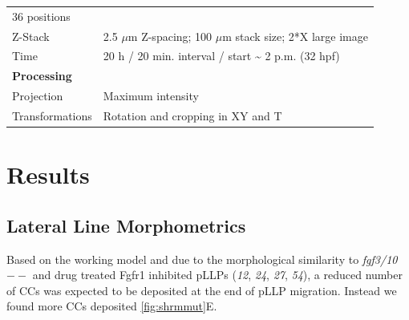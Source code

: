 \documentclass[11pt,singlespacinge,twoside]{reedthesis} %
\begin{document}
\begin{longtable}[]{@{}ll@{}}
\begin{minipage}[t]{0.73\columnwidth}
36 positions\strut
\end{minipage}\tabularnewline
\begin{minipage}[t]{0.21\columnwidth}\raggedright
Z-Stack\strut
\end{minipage} & \begin{minipage}[t]{0.73\columnwidth}\raggedright
2.5 \(\mu\)m Z-spacing; 100 \(\mu\)m stack size; 2*X large image\strut
\end{minipage}\tabularnewline
\begin{minipage}[t]{0.21\columnwidth}\raggedright
Time\strut
\end{minipage} & \begin{minipage}[t]{0.73\columnwidth}\raggedright
20 h / 20 min. interval / start \textasciitilde{} 2 p.m. (32 hpf)\strut
\end{minipage}\tabularnewline
\begin{minipage}[t]{0.21\columnwidth}\raggedright
\textbf{Processing}\strut
\end{minipage} & \begin{minipage}[t]{0.73\columnwidth}\raggedright
\strut
\end{minipage}\tabularnewline
\begin{minipage}[t]{0.21\columnwidth}\raggedright
Projection\strut
\end{minipage} & \begin{minipage}[t]{0.73\columnwidth}\raggedright
Maximum intensity\strut
\end{minipage}\tabularnewline
\begin{minipage}[t]{0.21\columnwidth}\raggedright
Transformations\strut
\end{minipage} & \begin{minipage}[t]{0.73\columnwidth}\raggedright
Rotation and cropping in XY and T\strut
\end{minipage}\tabularnewline
\bottomrule
\end{longtable}
\hypertarget{res}{%
\chapter{Results}\label{res}}

\hypertarget{lateral-line-morphometrics}{%
\section{Lateral Line Morphometrics}\label{lateral-line-morphometrics}}

Based on the working model and due to the morphological similarity to \emph{fgf3/10}\(--\) and drug treated Fgfr1 inhibited pLLPs (\emph{12}, \emph{24}, \emph{27}, \emph{54}), a reduced number of CCs was expected to be deposited at the end of pLLP migration. Instead we found more CCs deposited \ref{fig:shrmmut}E.
\end{document}
